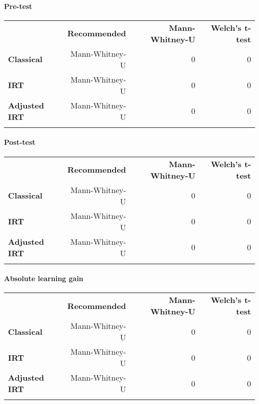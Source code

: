 \paragraph{Pre-test}\label{pre-test}

\begin{longtable}[c]{@{}lrrr@{}}
\toprule\addlinespace
& \textbf{Recommended} & \textbf{Mann-Whitney-U} & \textbf{Welch's
t-test}
\\\addlinespace
\midrule\endhead
\textbf{Classical} & Mann-Whitney-U & 0 & 0
\\\addlinespace
\textbf{IRT} & Mann-Whitney-U & 0 & 0
\\\addlinespace
\textbf{Adjusted IRT} & Mann-Whitney-U & 0 & 0
\\\addlinespace
\bottomrule
\end{longtable}

\paragraph{Post-test}\label{post-test}

\begin{longtable}[c]{@{}lrrr@{}}
\toprule\addlinespace
& \textbf{Recommended} & \textbf{Mann-Whitney-U} & \textbf{Welch's
t-test}
\\\addlinespace
\midrule\endhead
\textbf{Classical} & Mann-Whitney-U & 0 & 0
\\\addlinespace
\textbf{IRT} & Mann-Whitney-U & 0 & 0
\\\addlinespace
\textbf{Adjusted IRT} & Mann-Whitney-U & 0 & 0
\\\addlinespace
\bottomrule
\end{longtable}

\paragraph{Absolute learning gain}\label{absolute-learning-gain}

\begin{longtable}[c]{@{}lrrr@{}}
\toprule\addlinespace
& \textbf{Recommended} & \textbf{Mann-Whitney-U} & \textbf{Welch's
t-test}
\\\addlinespace
\midrule\endhead
\textbf{Classical} & Mann-Whitney-U & 0 & 0
\\\addlinespace
\textbf{IRT} & Mann-Whitney-U & 0 & 0
\\\addlinespace
\textbf{Adjusted IRT} & Mann-Whitney-U & 0 & 0
\\\addlinespace
\bottomrule
\end{longtable}

